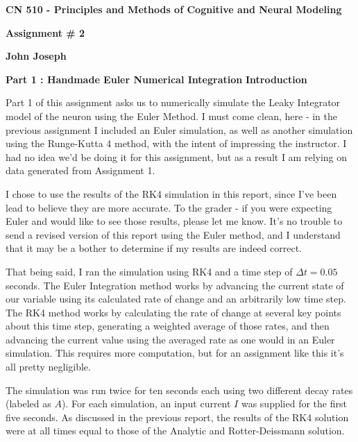 \documentclass[a4paper,12pt]{article}
\begin{document}
\begin{center}
{\Large\bf CN 510 - Principles and Methods of Cognitive and Neural Modeling}

\bigskip

{\large\bf Assignment \# 2}
\smallskip

{\large\bf John Joseph}
\end{center}

\bigskip
{\bf Part 1 : Handmade Euler Numerical Integration}
{\bf Introduction}
\bigskip

Part 1 of this assignment asks us to numerically simulate the Leaky Integrator model of the neuron using the Euler Method. I must come clean, here - in the previous assignment I included an Euler simulation, as well as another simulation using the Runge-Kutta 4 method, with the intent of impressing the instructor. I had no idea we'd be doing it for this assignment, but as a result I am relying on data generated from Assignment 1. 

\vspace{2mm}

I chose to use the results of the RK4 simulation in this report, since I've been lead to believe they are more accurate. To the grader - if you were expecting Euler and would like to see those results, please let me know. It's no trouble to send a revised version of this report using the Euler method, and I understand that it may be a bother to determine if my results are indeed correct. 

\vspace{2mm}

That being said, I ran the simulation using RK4 and a time step of $\Delta t=0.05$ seconds. The Euler Integration method works by advancing the current state of our variable using its calculated rate of change and an arbitrarily low time step. The RK4 method works by calculating the rate of change at several key points about this time step, generating a weighted average of those rates, and then advancing the current value using the averaged rate as one would in an Euler simulation. This requires more computation, but for an assignment like this it's all pretty negligible. 

\vspace{2mm}

The simulation was run twice for ten seconds each using two different decay rates (labeled as $A$). For each simulation, an input current $I$ was supplied for the first five seconds. As discussed in the previous report, the results of the RK4 solution were at all times equal to those of the Analytic and Rotter-Deissmann solution. 
\end{document}
